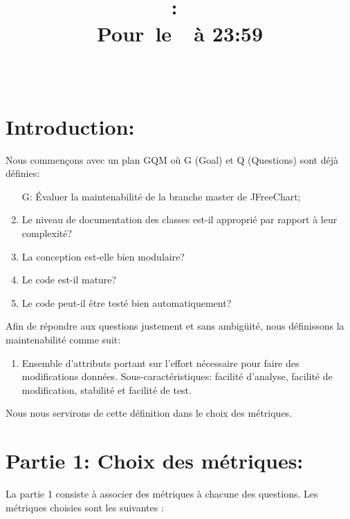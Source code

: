\documentclass{article}
\title{
    \vspace{2in}
    \textmd{\textbf{\hmwkClass:\ \hmwkTitle}}\\
    \normalsize\vspace{0.1in}\small{Pour\ le\ \hmwkDueDate\ à 23:59 }\\
    \vspace{0.1in}\large{\textit{\hmwkClassInstructor\ \hmwkClassTime}}
    \vspace{3in}
}
\author{\hmwkAuthorName}
\date{}
\begin{document}
\maketitle
\pagebreak

\section{Introduction:}
Nous commençons avec un plan GQM où G (Goal) et Q (Questions) sont déjà définies:

\begin{enumerate}[leftmargin=*, label=Q\arabic*:]
\item[G:] Évaluer la maintenabilité de la branche master de JFreeChart;
\item Le niveau de documentation des classes est-il approprié par rapport à leur complexité?
\item La conception est-elle bien modulaire?
\item Le code est-il mature?
\item Le code peut-il être testé bien automatiquement?
\end{enumerate}

Afin de répondre aux questions justement et sans ambigüité, nous définissons la maintenabilité comme suit:

\begin{enumerate}[leftmargin=*, rightmargin=2em, label=\textbullet]
\item
Ensemble d'attributs portant sur l'effort nécessaire pour faire des modifications données.
Sous-caractéristiques: facilité d'analyse, facilité de modification, stabilité et facilité de test.
\end{enumerate}

Nous nous servirons de cette définition dans le choix des métriques.

\section{Partie 1: Choix des métriques:}

La partie 1 consiste à associer des métriques à chacune des questions.
Les métriques choisies sont les suivantes :
\end{document}
